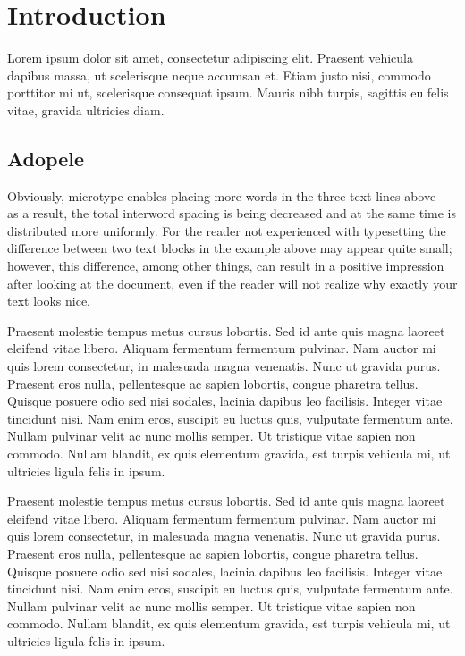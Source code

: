 \documentclass[a4paper,11pt]{report}
\begin{document}
\setcounter{chapter}{1}
\section{Introduction}

Lorem ipsum dolor sit amet, consectetur adipiscing elit.
Praesent vehicula dapibus massa, ut scelerisque neque accumsan et.
Etiam justo nisi, commodo porttitor mi ut, scelerisque consequat ipsum. Mauris nibh turpis,
sagittis eu felis vitae, gravida ultricies diam.

\subsection{Adopele}

Obviously, microtype enables placing more words in the three text lines above — as a result,
the total interword spacing is being decreased and at the same time is distributed more uniformly.
For the reader not experienced with typesetting the difference between two text blocks in the example
above may appear quite small; however, this difference, among other things, can result in a positive
impression after looking at the document, even if the reader will not realize why exactly your text looks nice.

\begin{multicols}{4}
  Praesent molestie tempus metus cursus lobortis. Sed id ante quis magna laoreet eleifend vitae libero.
  Aliquam fermentum fermentum pulvinar. Nam auctor mi quis lorem consectetur, in malesuada magna venenatis. Nunc ut gravida purus.
  Praesent eros nulla, pellentesque ac sapien lobortis, congue pharetra tellus. Quisque posuere odio sed nisi sodales,
  lacinia dapibus leo facilisis.
  Integer vitae tincidunt nisi. Nam enim eros, suscipit eu luctus quis, vulputate fermentum ante.
  Nullam pulvinar velit ac nunc mollis semper. Ut tristique vitae sapien non commodo. Nullam blandit, ex quis elementum gravida, est
  turpis vehicula mi, ut ultricies ligula felis in ipsum.
\end{multicols}

\begin{multicols}{3}
  Praesent molestie tempus metus cursus lobortis. Sed id ante quis magna laoreet eleifend vitae libero.
  Aliquam fermentum fermentum pulvinar. Nam auctor mi quis lorem consectetur, in malesuada magna venenatis. Nunc ut gravida purus.
  Praesent eros nulla, pellentesque ac sapien lobortis, congue pharetra tellus. Quisque posuere odio sed nisi sodales,
  lacinia dapibus leo facilisis.
  Integer vitae tincidunt nisi. Nam enim eros, suscipit eu luctus quis, vulputate fermentum ante.
  Nullam pulvinar velit ac nunc mollis semper. Ut tristique vitae sapien non commodo. Nullam blandit, ex quis elementum gravida, est
  turpis vehicula mi, ut ultricies ligula felis in ipsum.
\end{multicols}
\end{document}
